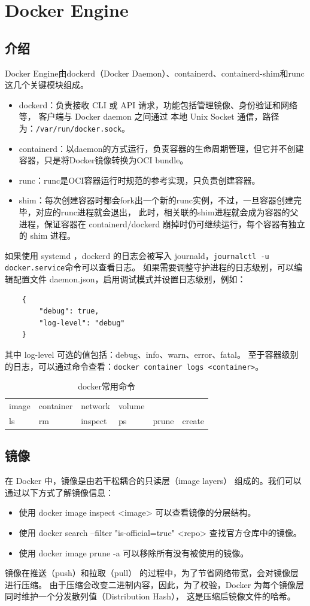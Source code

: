 \section{Docker Engine}
\subsection{介绍}
Docker Engine由dockerd（Docker Daemon）、containerd、containerd-shim和runc这几个关键模块组成。
\begin{itemize}
	\item dockerd：负责接收 CLI 或 API 请求，功能包括管理镜像、身份验证和网络等，
	客户端与 Docker daemon 之间通过 本地 Unix Socket 通信，路径为：\verb|/var/run/docker.sock|。
	\item containerd：以daemon的方式运行，负责容器的生命周期管理，但它并不创建容器，只是将Docker镜像转换为OCI bundle。
	\item runc：runc是OCI容器运行时规范的参考实现，只负责创建容器。
	\item shim：每次创建容器时都会fork出一个新的runc实例，不过，一旦容器创建完毕，对应的runc进程就会退出，
	此时，相关联的shim进程就会成为容器的父进程，保证容器在 containerd/dockerd 崩掉时仍可继续运行，每个容器有独立的 shim 进程。
\end{itemize}

如果使用 systemd ，dockerd 的日志会被写入 journald，\verb|journalctl -u docker.service|命令可以查看日志。
如果需要调整守护进程的日志级别，可以编辑配置文件 daemon.json，启用调试模式并设置日志级别，例如：
\begin{verbatim}
	{
		"debug": true,
		"log-level": "debug"
	}
\end{verbatim}
其中 log-level 可选的值包括：debug、info、warn、error、fatal。
至于容器级别的日志，可以通过命令查看：\verb|docker container logs <container>|。

\begin{table}[H]
	\centering
	\begin{tabular}{llllll}
		image  &  container & network  & volume   \\
		ls & rm & inspect & ps  & prune   & create \\
	\end{tabular}
	\caption{docker常用命令}
\end{table}

\subsection{镜像}
在 Docker 中，镜像是由若干松耦合的只读层（image layers） 组成的。我们可以通过以下方式了解镜像信息：
\begin{itemize}
	\item 使用 docker image inspect <image> 可以查看镜像的分层结构。
	\item 使用 docker search --filter "is-official=true" <repo> 查找官方仓库中的镜像。
	\item 使用 docker image prune -a 可以移除所有没有被使用的镜像。
\end{itemize}
镜像在推送（push）和拉取（pull） 的过程中，为了节省网络带宽，会对镜像层进行压缩。
由于压缩会改变二进制内容，因此，为了校验，Docker 为每个镜像层同时维护一个分发散列值（Distribution Hash），
这是压缩后镜像文件的哈希。

